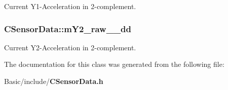 Current Y1-\/\-Acceleration in 2-\/complement. 

\subsubsection[{m\-Y2\-\_\-raw\-\_\-\-\_\-dd}]{ C\-Sensor\-Data\-::m\-Y2\-\_\-raw\-\_\-\-\_\-dd\hspace{0.3cm}{\ttfamily [private]}}\label{classCSensorData_a825a3cfff4953bddf4c7655ee44607bb}


Current Y2-\/\-Acceleration in 2-\/complement. 



The documentation for this class was generated from the following file\-:\begin{DoxyCompactItemize}
\item 
Basic/include/{\bf C\-Sensor\-Data.\-h}\end{DoxyCompactItemize}
